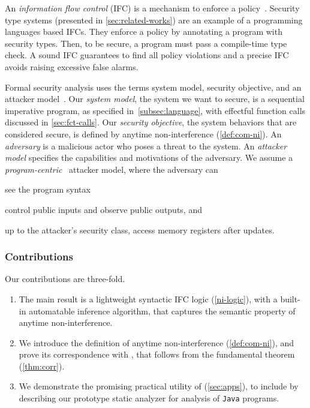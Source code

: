 An \emph{information flow control} (IFC) is a mechanism to enforce a
policy~\cite{bishop2003}. Security type systems (presented in
\autoref{sec:related-works}) are an example of a programming languages based
IFCs. They enforce a policy by annotating a program with security types. Then,
to be secure, a program must pass a compile-time type check. A sound IFC
guarantees to find all policy violations and a precise IFC avoids raising
excessive false alarms.

Formal security analysis uses the terms system model, security objective, and an
attacker model~\cite{bau2011,bognar2022}. Our \emph{system model}, \ie the
system we want to secure, is a sequential imperative program, as specified
in~\autoref{subsec:language}, with effectful function calls discussed in
\autoref{sec:fct-calls}. Our \emph{security objective}, \ie the system behaviors
that are considered secure, is defined by anytime non-interference
(\autoref{def:com-ni}). An \emph{adversary} is a malicious actor who poses a
threat to the system. An \emph{attacker model} specifies the capabilities and
motivations of the adversary. We assume a
\emph{program-centric}~\cite{hedin2012} attacker model, where the adversary can
\begin{enumerate*}[label=(\roman*)]
\item see the program syntax
\item control public inputs and observe public outputs, and
\item up to the attacker's security class, access memory registers after updates.
\end{enumerate*}

\subsubsection{Contributions}
Our contributions are three-fold.

\begin{enumerate}
\item The main result is a lightweight syntactic IFC logic \lname
(\autoref{ni-logic}), with a built-in automatable inference algorithm, that
captures the semantic property of anytime non-interference.

\item We introduce the definition of anytime non-interference
(\autoref{def:com-ni}), and prove its correspondence with \lname, that follows
from the fundamental theorem (\autoref{thm:corr}).

\item We demonstrate the promising practical utility of \lname
(\autoref{sec:apps}), to include by describing our prototype static analyzer
\tool for analysis of \texttt{Java} programs. \end{enumerate}

